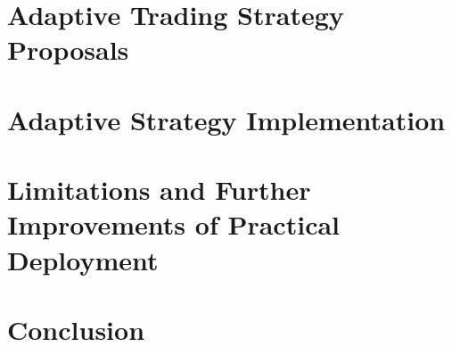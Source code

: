 \chapter{Adaptive Trading Strategy Proposals}
\label{proposal}

\chapter{Adaptive Strategy Implementation}
\label{implementation}

\chapter{Limitations and Further Improvements of Practical Deployment}
\label{limitations}

\chapter{Conclusion}
\label{conclusion}
